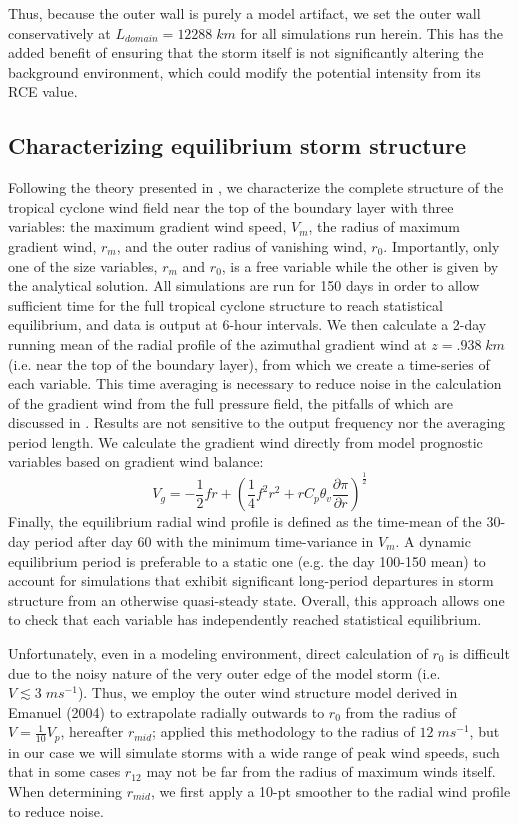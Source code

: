 \documentclass[12pt]{article}
\begin{document}
Thus, because the outer wall is purely a model artifact, we set the outer wall conservatively at $L_{domain} = 12288 \; km$ for all simulations run herein.  This has the added benefit of ensuring that the storm itself is not significantly altering the background environment, which could modify the potential intensity from its RCE value.

\subsection{Characterizing equilibrium storm structure}
Following the theory presented in \cite{Emanuel_Rotunno_2011}, we characterize the complete structure of the tropical cyclone wind field near the top of the boundary layer with three variables: the maximum gradient wind speed, $V_m$, the radius of maximum gradient wind, $r_m$, and the outer radius of vanishing wind, $r_0$. Importantly, only one of the size variables, $r_m$ and $r_0$, is a free variable while the other is given by the analytical solution.  All simulations are run for 150 days in order to allow sufficient time for the full tropical cyclone structure to reach statistical equilibrium, and data is output at 6-hour intervals. We then calculate a 2-day running mean of the radial profile of the azimuthal gradient wind at $z = .938 \; km$ (i.e. near the top of the boundary layer), from which we create a time-series of each variable. This time averaging is necessary to reduce noise in the calculation of the gradient wind from the full pressure field, the pitfalls of which are discussed in \cite{Bryan_Rotunno_2009}. Results are not sensitive to the output frequency nor the averaging period length. We calculate the gradient wind directly from model prognostic variables based on gradient wind balance:
\begin{equation}
\label{eq:vg}
V_g = -\frac{1}{2}fr + \left(\frac{1}{4}f^2r^2 + rC_p\theta_v\frac{\partial \pi}{\partial r}\right)^\frac{1}{2}
\end{equation}
Finally, the equilibrium radial wind profile is defined as the time-mean of the 30-day period after day 60 with the minimum time-variance in $V_m$. A dynamic equilibrium period is preferable to a static one (e.g. the day 100-150 mean) to account for simulations that exhibit significant long-period departures in storm structure from an otherwise quasi-steady state. Overall, this approach allows one to check that each variable has independently reached statistical equilibrium.

Unfortunately, even in a modeling environment, direct calculation of $r_0$ is difficult due to the noisy nature of the very outer edge of the model storm (i.e. $V \lesssim 3 \; ms^{-1}$). Thus, we employ the outer wind structure model derived in Emanuel (2004) to extrapolate radially outwards to $r_0$ from the radius of $V=\frac{1}{10}V_p$, hereafter $r_{mid}$; \cite{Chavas_Emanuel_2010} applied this methodology to the radius of $12 \; ms^{-1}$, but in our case we will simulate storms with a wide range of peak wind speeds, such that in some cases $r_{12}$ may not be far from the radius of maximum winds itself.  When determining $r_{mid}$, we first apply a 10-pt smoother to the radial wind profile to reduce noise.
\end{document}
